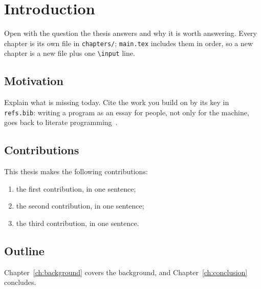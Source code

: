 \chapter{Introduction}
\label{ch:introduction}

Open with the question the thesis answers and why it is worth answering.
Every chapter is its own file in \texttt{chapters/}; \texttt{main.tex}
includes them in order, so a new chapter is a new file plus one
\texttt{\textbackslash input} line.

\section{Motivation}

Explain what is missing today. Cite the work you build on by its key in
\texttt{refs.bib}: writing a program as an essay for people, not only for the
machine, goes back to literate programming~\citep{knuth1984}.

\section{Contributions}

This thesis makes the following contributions:
\begin{enumerate}
  \item the first contribution, in one sentence;
  \item the second contribution, in one sentence;
  \item the third contribution, in one sentence.
\end{enumerate}

\section{Outline}

Chapter~\ref{ch:background} covers the background, and
Chapter~\ref{ch:conclusion} concludes.
